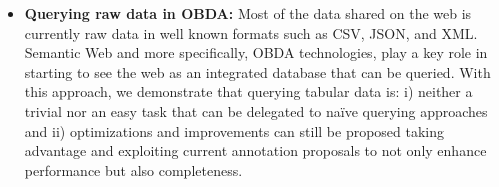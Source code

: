 \begin{itemize}
    \item \textbf{Querying raw data in OBDA:} Most of the data shared on the web is currently raw data in well known formats such as CSV, JSON, and XML. Semantic Web and more specifically, OBDA technologies, play a key role in starting to see the web as an integrated  database that can be queried. With this approach, we demonstrate that querying tabular data is: i) neither a trivial nor an easy task that can be delegated to na\"ive querying approaches and ii) optimizations and improvements can still be proposed taking advantage and exploiting current annotation proposals to not only enhance performance but also completeness.
\end{itemize}




